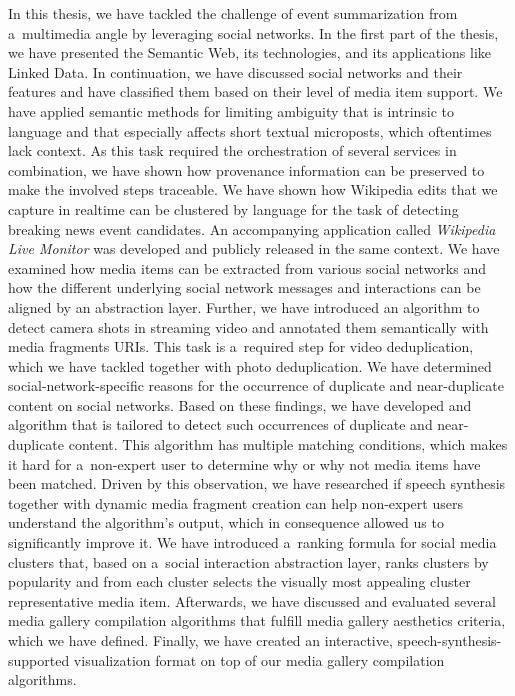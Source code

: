 In this thesis, we have tackled the challenge of event summarization
from a~multimedia angle by leveraging social networks.
In the first part of the thesis,
we have presented the Semantic Web,
its technologies, and its applications like Linked Data.
In continuation, we have discussed social networks
and their features and have classified them
based on their level of media item support.
We have applied semantic methods for limiting ambiguity
that is intrinsic to language and that especially affects
short textual microposts, which oftentimes lack context.
As this task required the orchestration of several services
in combination, we have shown how provenance information
can be preserved to make the involved steps traceable.
We have shown how Wikipedia edits
that we capture in realtime can be clustered by language
for the task of detecting breaking news event candidates.
An accompanying application called \emph{Wikipedia Live Monitor}
was developed and publicly released in the same context.
We have examined how media items can be extracted from 
various social networks and how the different
underlying social network messages and interactions
can be aligned by an abstraction layer.
Further, we have introduced an algorithm
to detect camera shots in streaming video and 
annotated them semantically with media fragments URIs.
This task is a~required step for video deduplication,
which we have tackled together with photo deduplication.
We have determined social-network-specific reasons
for the occurrence of duplicate and near-duplicate content
on social networks.
Based on these findings, we have developed and algorithm
that is tailored to detect such occurrences of duplicate
and near-duplicate content.
This algorithm has multiple matching conditions,
which makes it hard for a~non-expert user to determine
why or why not media items have been matched.
Driven by this observation, we have researched
if speech synthesis together with dynamic media fragment creation
can help non-expert users understand the algorithm's output,
which in consequence allowed us to significantly improve it.
We have introduced a~ranking formula for social media clusters
that, based on a~social interaction abstraction layer,
ranks clusters by popularity and from each cluster selects
the visually most appealing cluster representative media item.
Afterwards, we have discussed and evaluated several
media gallery compilation algorithms
that fulfill media gallery aesthetics criteria,
which we have defined.
Finally, we have created an interactive,
speech-synthesis-supported visualization format
on top of our media gallery compilation algorithms.

